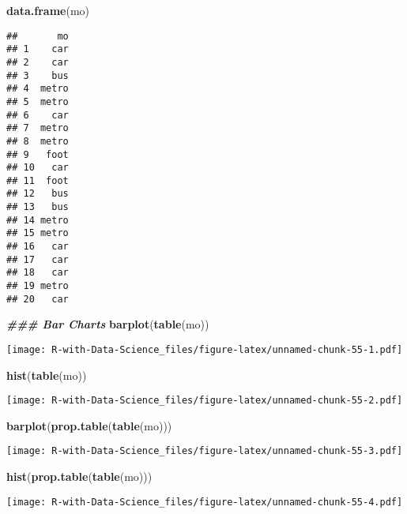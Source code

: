\documentclass[
]{article}
\newenvironment{Shaded}{\begin{snugshade}}{\end{snugshade}}
\newcommand{\DocumentationTok}[1]{\textcolor[rgb]{0.56,0.35,0.01}{\textbf{\textit{#1}}}}
\newcommand{\FunctionTok}[1]{\textcolor[rgb]{0.13,0.29,0.53}{\textbf{#1}}}
\newcommand{\NormalTok}[1]{#1}
\begin{document}
\begin{Shaded}
\begin{Highlighting}[]
\FunctionTok{data.frame}\NormalTok{(mo)}
\end{Highlighting}
\end{Shaded}

\begin{verbatim}
##       mo
## 1    car
## 2    car
## 3    bus
## 4  metro
## 5  metro
## 6    car
## 7  metro
## 8  metro
## 9   foot
## 10   car
## 11  foot
## 12   bus
## 13   bus
## 14 metro
## 15 metro
## 16   car
## 17   car
## 18   car
## 19 metro
## 20   car
\end{verbatim}

\begin{Shaded}
\begin{Highlighting}[]
\DocumentationTok{\#\#\# Bar Charts}
\FunctionTok{barplot}\NormalTok{(}\FunctionTok{table}\NormalTok{(mo))}
\end{Highlighting}
\end{Shaded}

\texttt{[image: R-with-Data-Science\_files/figure-latex/unnamed-chunk-55-1.pdf]}

\begin{Shaded}
\begin{Highlighting}[]
\FunctionTok{hist}\NormalTok{(}\FunctionTok{table}\NormalTok{(mo))}
\end{Highlighting}
\end{Shaded}

\texttt{[image: R-with-Data-Science\_files/figure-latex/unnamed-chunk-55-2.pdf]}

\begin{Shaded}
\begin{Highlighting}[]
\FunctionTok{barplot}\NormalTok{(}\FunctionTok{prop.table}\NormalTok{(}\FunctionTok{table}\NormalTok{(mo)))}
\end{Highlighting}
\end{Shaded}

\texttt{[image: R-with-Data-Science\_files/figure-latex/unnamed-chunk-55-3.pdf]}

\begin{Shaded}
\begin{Highlighting}[]
\FunctionTok{hist}\NormalTok{(}\FunctionTok{prop.table}\NormalTok{(}\FunctionTok{table}\NormalTok{(mo)))}
\end{Highlighting}
\end{Shaded}

\texttt{[image: R-with-Data-Science\_files/figure-latex/unnamed-chunk-55-4.pdf]}
\end{document}
